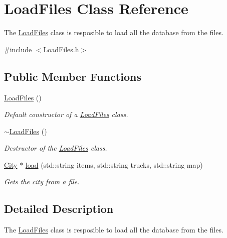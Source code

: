 \hypertarget{class_load_files}{}\section{Load\+Files Class Reference}
\label{class_load_files}


The \hyperlink{class_load_files}{Load\+Files} class is resposible to load all the database from the files.  




{\ttfamily \#include $<$Load\+Files.\+h$>$}

\subsection*{Public Member Functions}
\begin{DoxyCompactItemize}
\item 
\hyperlink{class_load_files_ac3ce9613b27f866cb317e41dea335148}{Load\+Files} ()\hypertarget{class_load_files_ac3ce9613b27f866cb317e41dea335148}{}\label{class_load_files_ac3ce9613b27f866cb317e41dea335148}

\begin{DoxyCompactList}\small\item\em Default constructor of a \hyperlink{class_load_files}{Load\+Files} class. \end{DoxyCompactList}\item 
\hyperlink{class_load_files_a87ad688ef3bee092d5f3eef5e5839a28}{$\sim$\+Load\+Files} ()\hypertarget{class_load_files_a87ad688ef3bee092d5f3eef5e5839a28}{}\label{class_load_files_a87ad688ef3bee092d5f3eef5e5839a28}

\begin{DoxyCompactList}\small\item\em Destructor of the \hyperlink{class_load_files}{Load\+Files} class. \end{DoxyCompactList}\item 
\hyperlink{class_city}{City} $\ast$ \hyperlink{class_load_files_af4ac93cdd4550322ae5dddb4b67e6faa}{load} (std\+::string items, std\+::string trucks, std\+::string map)
\begin{DoxyCompactList}\small\item\em Gets the city from a file. \end{DoxyCompactList}\end{DoxyCompactItemize}


\subsection{Detailed Description}
The \hyperlink{class_load_files}{Load\+Files} class is resposible to load all the database from the files. 

